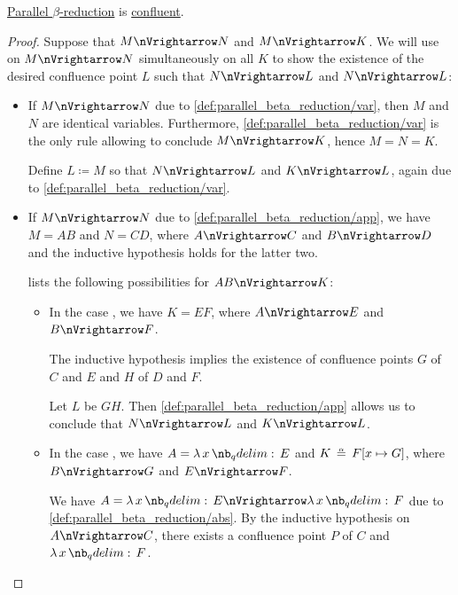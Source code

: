 \begin{proposition}\label{thm:parallel_beta_church_rosser}
  \hyperref[def:parallel_beta_reduction]{Parallel \( \beta \)-reduction} is \hyperref[def:relation_confluence]{confluent}.
\end{proposition}
\begin{proof}
  Suppose that \( M \pred N \) and \( M \pred K \). We will use  on \( M \pred N \) simultaneously on all \( K \) to show the existence of the desired confluence point \( L \) such that \( N \pred L \) and \( N \pred L \):
  \begin{itemize}
    \item If \( M \pred N \) due to \ref{def:parallel_beta_reduction/var}, then \( M \) and \( N \) are identical variables. Furthermore, \ref{def:parallel_beta_reduction/var} is the only rule allowing to conclude \( M \pred K \), hence \( M = N = K \).

    Define \( L \coloneqq M \) so that \( N \pred L \) and \( K \pred L \), again due to \ref{def:parallel_beta_reduction/var}.

    \item If \( M \pred N \) due to \ref{def:parallel_beta_reduction/app}, we have \( M = AB \) and \( N = CD \), where \( A \pred C \) and \( B \pred D \) and the inductive hypothesis holds for the latter two.

     lists the following possibilities for \( AB \pred K \):
    \begin{itemize}
      \item In the case , we have \( K = EF \), where \( A \pred E \) and \( B \pred F \).

      The inductive hypothesis implies the existence of confluence points \( G \) of \( C \) and \( E \) and \( H \) of \( D \) and \( F \).

      Let \( L \) be \( GH \). Then \ref{def:parallel_beta_reduction/app} allows us to conclude that \( N \pred L \) and \( K \pred L \).

      \item In the case , we have \( A = \qabs x E \) and \( K \aequiv F[x \mapsto G] \), where \( B \pred G \) and \( E \pred F \).

      We have \( A = \qabs x E \pred \qabs x F \) due to \ref{def:parallel_beta_reduction/abs}. By the inductive hypothesis on \( A \pred C \), there exists a confluence point \( P \) of \( C \) and \( \qabs x F \).


\end{itemize}
\end{itemize}
\end{proof}
